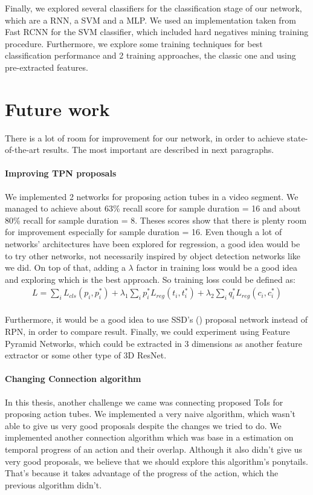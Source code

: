 Finally, we explored several classifiers for the classification stage of our network, which are a RNN, a SVM and a MLP.  We used an implementation taken from Fast RCNN
for the SVM classifier, which included hard negatives mining training procedure. Furthermore, we explore some training techniques for best classification performance and
2 training approaches, the classic one and using pre-extracted features. 

\section{Future work}
There is a lot of room for improvement for our network, in order to achieve state-of-the-art results. The most important are described in next paragraphs.

\paragraph{Improving TPN proposals} We implemented 2 networks for proposing action tubes in a video segment. We managed to achieve about 63\% recall score for
sample duration = 16 and about 80\% recall for sample duration = 8. Theses scores show that there is plenty room for improvement especially for sample duration = 16.
Even though a lot of networks' architectures have been explored for regression, a good idea would be to try other networks, not necessarily inspired by object detection
networks like we did. On top of that, adding a $\lambda$ factor in training loss would be a good idea and exploring which is the best approach.
So training loss could be defined as:
\begin{equation} 
\begin{split}
 L  =  \sum_iL_{cls}(p_i, p_i^*) + \lambda_1 \sum_ip_i^*L_{reg}(t_i,t_i^*) + \lambda_2  \sum_iq_i^*L_{reg}(c_{i}, c_{i}^*) \\
\end{split}
\end{equation}

Furthermore, it would be a good idea to use SSD's (\cite{DBLP:journals/corr/LiuAESR15}) proposal network instead of RPN, in order to compare result. Finally,
we could experiment using Feature Pyramid Networks, which could be extracted in 3 dimensions as another feature extractor or some other type of 3D ResNet.

\paragraph{Changing Connection algorithm}
In this thesis, another challenge we came was connecting proposed ToIs for proposing action tubes. We implemented a very naive algorithm, which wasn't
able to give us very good proposals despite the changes we tried to do. We implemented another connection algorithm which was base in a estimation on temporal
progress of an action and their overlap. Although it also didn't give us very good proposals, we believe that we should explore this algorithm's ponytails. That's
because it takes advantage of the progress of the action, which the previous algorithm didn't.

